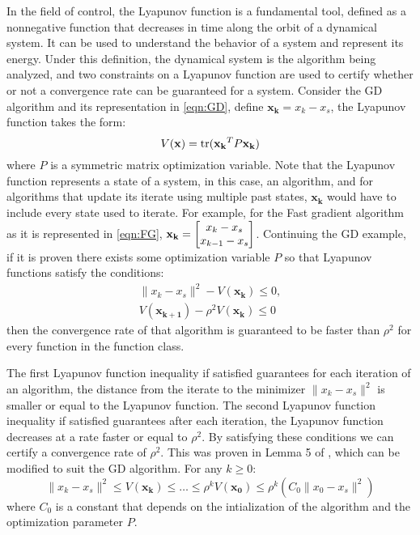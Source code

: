 In the field of control, the Lyapunov function is a fundamental tool, defined as a nonnegative function that decreases in time along the orbit of a dynamical system. It can be used to understand the behavior of a system and represent its energy. Under this definition, the dynamical system is the algorithm being analyzed, and two constraints on a Lyapunov function are used to certify whether or not a convergence rate can be guaranteed for a system. Consider the GD algorithm and its representation in \eqref{eqn:GD}, define $\mathbf{x_k} = x_k - x_s$, the Lyapunov function takes the form:
\begin{equation}
	V(\mathbf{x}) = \operatorname{\mathrm{tr}}(\mathbf{x_k}^TP\mathbf{x_k}) \label{eqn:Lyapunov}
\end{equation}
where $P$ is a symmetric matrix optimization variable. Note that the Lyapunov function represents a state of a system, in this case, an algorithm, and for algorithms that update its iterate using multiple past states, $\mathbf{x_k}$ would have to include every state used to iterate. For example, for the Fast gradient algorithm as it is represented in \eqref{eqn:FG}, $\mathbf{x_k} = \begin{bmatrix}x_{k} - x_s \\ x_{k-1} - x_s\end{bmatrix}$. Continuing the GD example, if it is proven there exists some optimization variable $P$ so that Lyapunov functions satisfy the conditions:
\begin{subequations} \label{eqn:Ly_ineq}
	\begin{align}
	  \|x_k - x_s\|^2 - V(\mathbf{x_k}) \leq 0,      \\
	  V(\mathbf{x_{k+1}}) - \rho^2 V(\mathbf{x_k}) \leq 0
	\end{align}
\end{subequations}
then the convergence rate of that algorithm is guaranteed to be faster than $\rho^2 $ for every function in the function class.

The first Lyapunov function inequality if satisfied guarantees for each iteration of an algorithm, the distance from the iterate to the minimizer $\|x_k - x_s\|^2$ is smaller or equal to the Lyapunov function. The second Lyapunov function inequality if satisfied guarantees after each iteration, the Lyapunov function decreases at a rate faster or equal to $\rho^2$. By satisfying these conditions we can certify a convergence rate of $\rho^2$. This was proven in Lemma 5 of \cite{tutorial}, which can be modified to suit the GD algorithm. For any $k \geq 0$:
\begin{equation}
	\|x_k - x_s\|^2 \leq V(\mathbf{x_{k}}) \leq \ldots \leq \rho^{k}V(\mathbf{x_{0}}) \leq \rho^k(C_0\|x_0 - x_s\|^2)
\end{equation}
where $C_0$ is a constant that depends on the intialization of the algorithm and the optimization parameter $P$.

